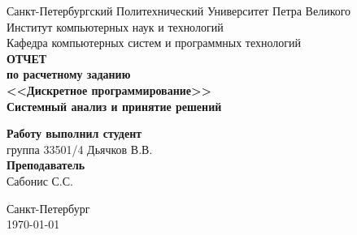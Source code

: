 \begin{titlepage}
\begin{center}
	Санкт-Петербургский Политехнический Университет Петра Великого\\[0.3cm]
	Институт компьютерных наук и технологий \\[0.3cm]
	Кафедра компьютерных систем и программных технологий\\[4cm]
	
	\textbf{ОТЧЕТ}\\ 
	\textbf{по расчетному заданию}\\[0.5cm]
	\textbf{<<Дискретное программирование>>}\\[0.1cm]
	\textbf{Системный анализ и принятие решений}\\[4.0cm]
\end{center}

\begin{flushright}
	\begin{minipage}{0.45\textwidth}
		\textbf{Работу выполнил студент}\\[3mm]
		группа 33501/4 \hspace*{6mm} Дьячков В.В.\\[5mm]
		\textbf{Преподаватель}\\[5mm]
		\sign[3.5cm] \hspace*{5mm} Сабонис С.С. \\[5mm]
	\end{minipage}
\end{flushright}

\vfill

\begin{center}
	Санкт-Петербург\\
	\today
\end{center}
\end{titlepage}

\addtocounter{page}{1}